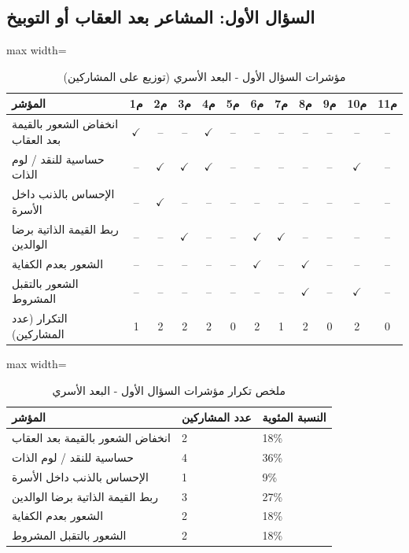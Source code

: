 \documentclass[12pt,oneside]{report}
\begin{document}
\subsection{السؤال الأول: المشاعر بعد العقاب أو التوبيخ}
\begin{table}[H]
\centering
\caption{مؤشرات السؤال الأول - البعد الأسري (توزيع على المشاركين)}
\scriptsize
\renewcommand{\arraystretch}{1.3}
\setlength{\tabcolsep}{4pt}
\begin{adjustbox}{max width=\textwidth}
\begin{tabular}{l c c c c c c c c c c c}
\toprule
\textbf{المؤشر} & \textbf{م1} & \textbf{م2} & \textbf{م3} & \textbf{م4} & \textbf{م5} & \textbf{م6} & \textbf{م7} & \textbf{م8} & \textbf{م9} & \textbf{م10} & \textbf{م11} \\
\midrule
انخفاض الشعور بالقيمة بعد العقاب & $\checkmark$ & -- & -- & $\checkmark$ & -- & -- & -- & -- & -- & -- & -- \\
حساسية للنقد / لوم الذات & -- & $\checkmark$ & $\checkmark$ & $\checkmark$ & -- & -- & -- & -- & -- & $\checkmark$ & -- \\
الإحساس بالذنب داخل الأسرة & -- & $\checkmark$ & -- & -- & -- & -- & -- & -- & -- & -- & -- \\
ربط القيمة الذاتية برضا الوالدين & -- & -- & $\checkmark$ & -- & -- & $\checkmark$ & $\checkmark$ & -- & -- & -- & -- \\
الشعور بعدم الكفاية & -- & -- & -- & -- & -- & $\checkmark$ & -- & $\checkmark$ & -- & -- & -- \\
الشعور بالتقبل المشروط & -- & -- & -- & -- & -- & -- & -- & $\checkmark$ & -- & $\checkmark$ & -- \\
التكرار (عدد المشاركين) & 1 & 2 & 2 & 2 & 0 & 2 & 1 & 2 & 0 & 2 & 0 \\
\bottomrule
\end{tabular}
\end{adjustbox}
\end{table}
\begin{table}[H]
\centering
\caption{ملخص تكرار مؤشرات السؤال الأول - البعد الأسري}
\small
\renewcommand{\arraystretch}{1.3}
\setlength{\tabcolsep}{4pt}
\begin{adjustbox}{max width=\textwidth}
\begin{tabular}{p{6cm} p{4cm} p{4cm}}
\toprule
\textbf{المؤشر} & \textbf{عدد المشاركين} & \textbf{النسبة المئوية} \\
\midrule
انخفاض الشعور بالقيمة بعد العقاب & 2 & 18\% \\
حساسية للنقد / لوم الذات & 4 & 36\% \\
الإحساس بالذنب داخل الأسرة & 1 & 9\% \\
ربط القيمة الذاتية برضا الوالدين & 3 & 27\% \\
الشعور بعدم الكفاية & 2 & 18\% \\
الشعور بالتقبل المشروط & 2 & 18\% \\
\bottomrule
\end{tabular}
\end{adjustbox}
\end{table}
\end{document}
